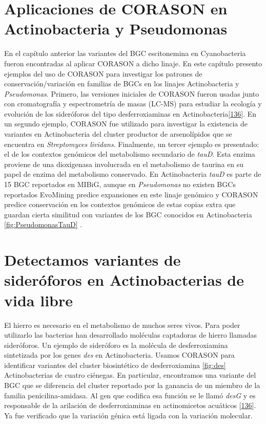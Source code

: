 \documentclass[12pt,twoside]{reedthesis}
\begin{document}
  \section{Aplicaciones de CORASON en Actinobacteria y
  Pseudomonas}\label{aplicaciones-de-corason-en-actinobacteria-y-pseudomonas}
  
  En el capítulo anterior las variantes del BGC escitonemina en
  Cyanobacteria fueron encontradas al aplicar CORASON a dicho linaje. En
  este capítulo presento ejemplos del uso de CORASON para investigar los
  patrones de conservación/variación en familias de BGCs en los linajes
  Actinobacteria y \emph{Pseudomonas}. Primero, las versiones iniciales de
  CORASON fueron usadas junto con cromatografía y espectrometría de masas
  (LC-MS) para estudiar la ecología y evolución de los sideróforos del
  tipo desferroxiaminas en
  Actinobacteria{[}\protect\hyperlink{ref-cruz-morales_actinobacteria_2017}{136}{]}.
  En un segundo ejemplo, CORASON fue utilizado para investigar la
  existencia de variantes en Actinobacteria del cluster productor de
  arsenolípidos que se encuentra en \emph{Streptomyces lividans}.
  Finalmente, un tercer ejemplo es presentado: el de los contextos
  genómicos del metabolismo secundario de \emph{tauD}. Esta enzima
  proviene de una dioxigenasa involucrada en el metabolismo de taurina en
  su papel de enzima del metabolismo conservado. En Actinobacteria
  \emph{tauD} es parte de 15 BGC reportados en MIBiG, aunque en
  \emph{Pseudomonas} no existen BGCs reportados EvoMining predice
  expansiones en este linaje genómico y CORASON predice conservación en
  los contextos genómicos de estas copias extra que guardan cierta
  similitud con variantes de los BGC conocidos en Actinobacteria
  \autoref{fig:PseudomonasTauD} .
  
  \section{Detectamos variantes de sideróforos en Actinobacterias de vida
  libre}\label{detectamos-variantes-de-sideroforos-en-actinobacterias-de-vida-libre}
  
  El hierro es necesario en el metabolismo de muchos seres vivos. Para
  poder utilizarlo las bacterias han desarrollado moléculas captadoras de
  hierro llamadas sideróforos. Un ejemplo de sideróforo es la molécula de
  desferroxiamina sintetizada por los genes \emph{des} en Actinobacteria.
  Usamos CORASON para identificar variantes del cluster biosintético de
  desferroxiamina \autoref{fig:des} Actinobacterias de cuatro ciénegas. En
  particular, encontramos una variante del BGC que se diferencia del
  cluster reportado por la ganancia de un miembro de la familia
  penicilina-amidasa. Al gen que codifica esa función se le llamó
  \emph{desG} y es responsable de la arilación de desferroxiaminas en
  actinomicetos acuáticos
  {[}\protect\hyperlink{ref-cruz-morales_actinobacteria_2017}{136}{]}. Ya
  fue verificado que la variación génica está ligada con la variación
  molecular.
  
\end{document}
